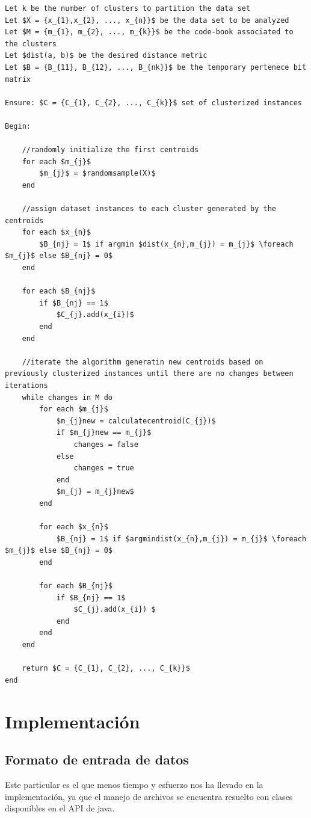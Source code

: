 \documentclass[10pt,a4paper]{article}
\begin{document}
\begin{lstlisting}[mathescape=true]
Let k be the number of clusters to partition the data set
Let $X = {x_{1},x_{2}, ..., x_{n}}$ be the data set to be analyzed
Let $M = {m_{1}, m_{2}, ..., m_{k}}$ be the code-book associated to the clusters
Let $dist(a, b)$ be the desired distance metric
Let $B = {B_{11}, B_{12}, ..., B_{nk}}$ be the temporary pertenece bit matrix

Ensure: $C = {C_{1}, C_{2}, ..., C_{k}}$ set of clusterized instances

Begin:

	//randomly initialize the first centroids
	for each $m_{j}$
		$m_{j}$ = $randomsample(X)$
	end
	
	//assign dataset instances to each cluster generated by the centroids
	for each $x_{n}$
		$B_{nj} = 1$ if argmin $dist(x_{n},m_{j}) = m_{j}$ \foreach $m_{j}$ else $B_{nj} = 0$ 
	end
		
	for each $B_{nj}$
		if $B_{nj} == 1$
			$C_{j}.add(x_{i})$ 
		end
	end
	
	//iterate the algorithm generatin new centroids based on previously clusterized instances until there are no changes between iterations
	while changes in M do
		for each $m_{j}$
			$m_{j}new = calculatecentroid(C_{j})$
			if $m_{j}new == m_{j}$
				changes = false
			else
				changes = true
			end
			$m_{j} = m_{j}new$	
		end
		
		for each $x_{n}$
			$B_{nj} = 1$ if $argmindist(x_{n},m_{j}) = m_{j}$ \foreach $m_{j}$ else $B_{nj} = 0$
		end
		
		for each $B_{nj}$
			if $B_{nj} == 1$
				$C_{j}.add(x_{i}) $
			end
		end
	end
	
	return $C = {C_{1}, C_{2}, ..., C_{k}}$
end

\end{lstlisting}

\newpage

\section{Implementación}

\subsection{Formato de entrada de datos}

Este particular es el que menos tiempo y esfuerzo nos ha llevado en la implementación, ya que el manejo de archivos se encuentra resuelto con clases disponibles en el API de java.\\
\end{document}
